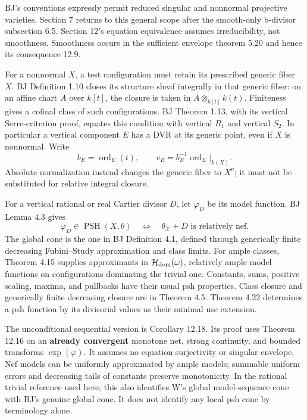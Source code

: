 \documentclass[
  11pt,
]{article}
\begin{document}
BJ's conventions expressly permit reduced singular and nonnormal
projective varieties. Section 7 returns to this general scope after the
smooth-only b-divisor subsection 6.5. Section 12's equation equivalence
assumes irreducibility, not smoothness. Smoothness occurs in the
sufficient envelope theorem 5.20 and hence its consequence 12.9.

For a nonnormal \(X\), a test configuration must retain its prescribed
generic fiber \(X\). BJ Definition 1.10 closes its structure sheaf
integrally in that generic fiber: on an affine chart \(A\) over
\(k[t]\), the closure is taken in \(A\otimes_{k[t]}k(t)\). Finiteness
gives a cofinal class of such configurations. BJ Theorem 1.13, with its
vertical Serre-criterion proof, equates this condition with vertical
\(R_1\) and vertical \(S_2\). In particular a vertical component \(E\)
has a DVR at its generic point, even if \(X\) is nonnormal. Write \[
 b_E=\operatorname{ord}_E(t),\qquad
 v_E=b_E^{-1}\operatorname{ord}_E|_{k(X)}.
\] Absolute normalization instead changes the generic fiber to
\(X^\nu\); it must not be substituted for relative integral closure.

For a vertical rational or real Cartier divisor \(D\), let \(\varphi_D\)
be its model function. BJ Lemma 4.3 gives \[
 \varphi_D\in\operatorname{PSH}(X,\theta)
 \quad\Longleftrightarrow\quad \theta_{\mathcal X}+D\text{ is relatively nef}.
 \tag{3}
\] The global cone is the one in BJ Definition 4.1, defined through
generically finite decreasing Fubini--Study approximation and class
limits. For ample classes, Theorem 4.15 supplies approximants in
\(\mathcal H_{\rm dom}(\omega)\), relatively ample model functions on
configurations dominating the trivial one. Constants, sums, positive
scaling, maxima, and pullbacks have their usual psh properties. Class
closure and generically finite decreasing closure are in Theorem 4.5.
Theorem 4.22 determines a psh function by its divisorial values as their
minimal usc extension.

The unconditional sequential version is Corollary 12.18. Its proof uses
Theorem 12.16 on an \textbf{already convergent} monotone net, strong
continuity, and bounded transforms \(\exp(\varphi)\). It assumes no
equation surjectivity or singular envelope. Nef models can be uniformly
approximated by ample models; summable uniform errors and decreasing
tails of constants preserve monotonicity. In the rational trivial
reference used here, this also identifies W's global model-sequence cone
with BJ's genuine global cone. It does not identify any local psh cone
by terminology alone.
\end{document}
